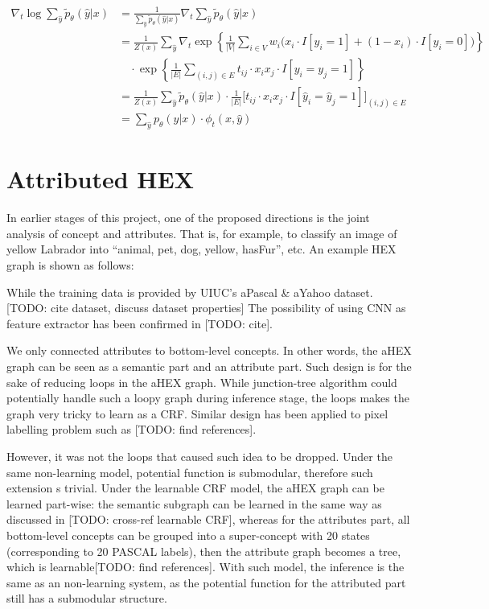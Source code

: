 \documentclass[11pt,a4paper]{article}
\begin{document}
\begin{align*}
\nabla_t\log\sum_{\hat{y}}\tilde{p}_\theta(\hat{y}|x)&=\frac{1}{\sum_{\hat{y}}\tilde{p}_\theta(\hat{y}|x)}\nabla_t\sum_{\hat{y}}\tilde{p}_\theta(\hat{y}|x)\\
&=\frac{1}{Z(x)}\sum_{\hat{y}}\nabla_t\exp\left\{\frac{1}{|V|}\sum_{i\in V}w_i\big(x_i\cdot I[y_i=1]+(1-x_i)\cdot I[y_i=0]\big)\right\}\\
&\quad\cdot\exp\left\{\frac{1}{|E|}\sum_{(i,j)\in E}t_{ij}\cdot x_ix_j\cdot I[y_i=y_j=1]\right\}\\
&=\frac{1}{Z(x)}\sum_{\hat{y}}\tilde{p}_\theta(\hat{y}|x)\cdot\frac{1}{|E|}\Big[t_{ij}\cdot x_ix_j\cdot I[\hat{y}_i=\hat{y}_j=1]\Big]_{(i,j)\in E}\\
&=\sum_{\hat{y}}p_\theta(\hat{y}|x)\cdot\phi_t(x,\hat{y})
\end{align*}

\appendix
\section{Attributed HEX}

In earlier stages of this project, one of the proposed directions is the joint analysis of concept and attributes. That is, for example, to classify an image of yellow Labrador into ``animal, pet, dog, yellow, hasFur'', etc. An example HEX graph is shown as follows:

While the training data is provided by UIUC's aPascal \& aYahoo dataset. [TODO: cite dataset, discuss dataset properties] The possibility of using CNN as feature extractor has been confirmed in [TODO: cite].

We only connected attributes to bottom-level concepts. In other words, the aHEX graph can be seen as a semantic part and an attribute part. Such design is for the sake of reducing loops in the aHEX graph. While junction-tree algorithm could potentially handle such a loopy graph during inference stage, the loops makes the graph very tricky to learn as a CRF. Similar design has been applied to pixel labelling problem such as [TODO: find references].

However, it was not the loops that caused such idea to be dropped. Under the same non-learning model, potential function is submodular, therefore such extension s trivial. Under the learnable CRF model, the aHEX graph can be learned part-wise: the semantic subgraph can be learned in the same way as discussed in [TODO: cross-ref learnable CRF], whereas for the attributes part, all bottom-level concepts can be grouped into a super-concept with 20 states (corresponding to 20 PASCAL labels), then the attribute graph becomes a tree, which is learnable[TODO: find references]. With such model, the inference is the same as an non-learning system, as the potential function for the attributed part still has a submodular structure.
\end{document}
